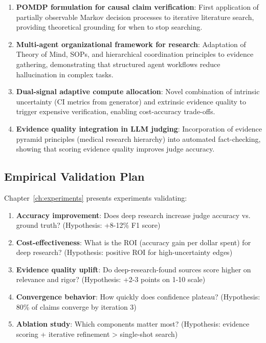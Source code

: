 \begin{enumerate}
    \item \textbf{POMDP formulation for causal claim verification}: First application of partially observable Markov decision processes to iterative literature search, providing theoretical grounding for when to stop searching.
    
    \item \textbf{Multi-agent organizational framework for research}: Adaptation of Theory of Mind, SOPs, and hierarchical coordination principles to evidence gathering, demonstrating that structured agent workflows reduce hallucination in complex tasks.
    
    \item \textbf{Dual-signal adaptive compute allocation}: Novel combination of intrinsic uncertainty (CI metrics from generator) and extrinsic evidence quality to trigger expensive verification, enabling cost-accuracy trade-offs.
    
    \item \textbf{Evidence quality integration in LLM judging}: Incorporation of evidence pyramid principles (medical research hierarchy) into automated fact-checking, showing that scoring evidence quality improves judge accuracy.
\end{enumerate}

\subsection{Empirical Validation Plan}

Chapter~\ref{ch:experiments} presents experiments validating:

\begin{enumerate}
    \item \textbf{Accuracy improvement}: Does deep research increase judge accuracy vs. ground truth? (Hypothesis: +8-12\% F1 score)
    
    \item \textbf{Cost-effectiveness}: What is the ROI (accuracy gain per dollar spent) for deep research? (Hypothesis: positive ROI for high-uncertainty edges)
    
    \item \textbf{Evidence quality uplift}: Do deep-research-found sources score higher on relevance and rigor? (Hypothesis: +2-3 points on 1-10 scale)
    
    \item \textbf{Convergence behavior}: How quickly does confidence plateau? (Hypothesis: 80\% of claims converge by iteration 3)
    
    \item \textbf{Ablation study}: Which components matter most? (Hypothesis: evidence scoring + iterative refinement > single-shot search)
\end{enumerate}

